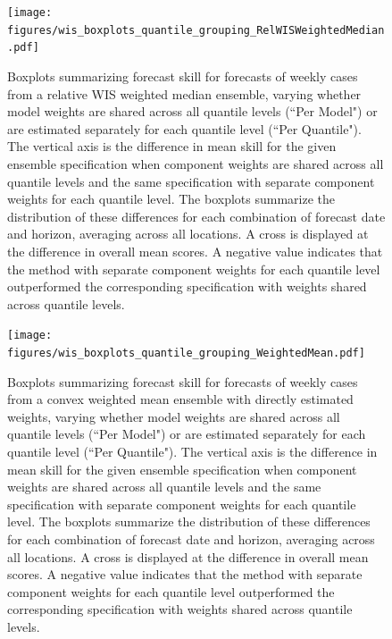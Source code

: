 \documentclass{article}
\begin{document}
\begin{figure}[H]
  \texttt{[image: figures/wis\_boxplots\_quantile\_grouping\_RelWISWeightedMedian.pdf]}
  \caption{Boxplots summarizing forecast skill for forecasts of weekly cases from a relative WIS weighted median ensemble, varying whether model weights are shared across all quantile levels (``Per Model") or are estimated separately for each quantile level (``Per Quantile").
  The vertical axis is the difference in mean skill for the given ensemble specification when component weights are shared across all quantile levels and the same specification with separate component weights for each quantile level.
  The boxplots summarize the distribution of these differences for each combination of forecast date and horizon, averaging across all locations.
  A cross is displayed at the difference in overall mean scores.
  A negative value indicates that the method with separate component weights for each quantile level outperformed the corresponding specification with weights shared across quantile levels.}
  \label{fig:wis_quantile_grouping_rel_wis}
\end{figure}

\begin{figure}[H]
  \texttt{[image: figures/wis\_boxplots\_quantile\_grouping\_WeightedMean.pdf]}
  \caption{Boxplots summarizing forecast skill for forecasts of weekly cases from a convex weighted mean ensemble with directly estimated weights, varying whether model weights are shared across all quantile levels (``Per Model") or are estimated separately for each quantile level (``Per Quantile").
  The vertical axis is the difference in mean skill for the given ensemble specification when component weights are shared across all quantile levels and the same specification with separate component weights for each quantile level.
  The boxplots summarize the distribution of these differences for each combination of forecast date and horizon, averaging across all locations.
  A cross is displayed at the difference in overall mean scores.
  A negative value indicates that the method with separate component weights for each quantile level outperformed the corresponding specification with weights shared across quantile levels.}
  \label{fig:wis_quantile_grouping_convex}
\end{figure}
\end{document}
